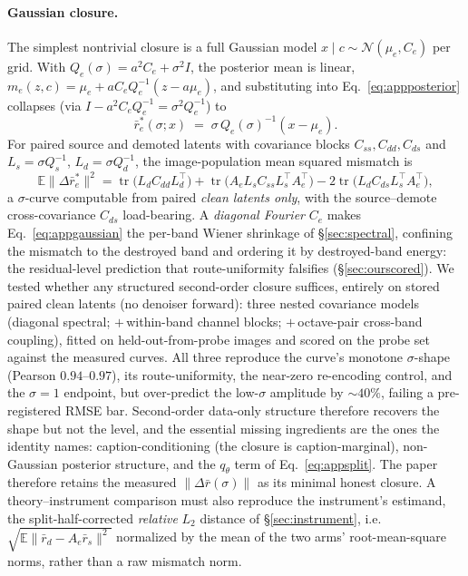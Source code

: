 \paragraph{Gaussian closure.}
The simplest nontrivial closure is a full Gaussian model
$x \mid c \sim \mathcal{N}(\mu_e, C_e)$ per grid. With
$Q_e(\sigma) = a^2 C_e + \sigma^2 I$, the posterior mean is linear,
$m_e(z, c) = \mu_e + a C_e Q_e^{-1}(z - a \mu_e)$, and substituting
into Eq.~\ref{eq:appposterior} collapses (via
$I - a^2 C_e Q_e^{-1} = \sigma^2 Q_e^{-1}$) to
\begin{equation}
\bar r_e^{*}(\sigma; x) \;=\; \sigma\, Q_e(\sigma)^{-1} (x - \mu_e).
\label{eq:appgaussian}
\end{equation}
For paired source and demoted latents with covariance blocks
$C_{ss}, C_{dd}, C_{ds}$ and $L_s = \sigma Q_s^{-1}$,
$L_d = \sigma Q_d^{-1}$, the image-population mean squared mismatch is
\begin{equation}
\mathbb{E}\big\|\Delta \bar r_e^{*}\big\|^2
= \operatorname{tr}\!\big(L_d C_{dd} L_d^{\!\top}\big)
+ \operatorname{tr}\!\big(A_e L_s C_{ss} L_s^{\!\top}
  A_e^{\!\top}\big)
- 2 \operatorname{tr}\!\big(L_d C_{ds} L_s^{\!\top}
  A_e^{\!\top}\big),
\label{eq:apptrace}
\end{equation}
a $\sigma$-curve computable from paired \emph{clean latents only},
with the source--demote cross-covariance $C_{ds}$ load-bearing. A
\emph{diagonal Fourier} $C_e$ makes Eq.~\ref{eq:appgaussian} the
per-band Wiener shrinkage of \S\ref{sec:spectral}, confining the
mismatch to the destroyed band and ordering it by destroyed-band
energy: the residual-level prediction that route-uniformity
falsifies (\S\ref{sec:ourscored}). We tested whether any structured
second-order closure suffices, entirely on stored paired clean
latents (no denoiser forward): three nested covariance models
(diagonal spectral; $+$\,within-band channel blocks;
$+$\,octave-pair cross-band coupling), fitted on held-out-from-probe
images and scored on the probe set against the measured curves. All
three reproduce the curve's monotone $\sigma$-shape (Pearson
$0.94$--$0.97$), its route-uniformity, the near-zero re-encoding
control, and the $\sigma{=}1$ endpoint, but over-predict the
low-$\sigma$ amplitude by ${\sim}40\%$, failing a pre-registered
RMSE bar. Second-order data-only structure therefore recovers the
shape but not the level, and the essential missing ingredients are
the ones the identity names: caption-conditioning (the closure is
caption-marginal), non-Gaussian posterior structure, and the
$q_{\theta}$ term of Eq.~\ref{eq:appsplit}. The paper therefore
retains the measured $\|\Delta \bar r(\sigma)\|$ as its minimal
honest closure. A theory--instrument comparison must also reproduce
the instrument's estimand, the split-half-corrected \emph{relative}
$L_2$ distance of \S\ref{sec:instrument}, i.e.\
$\sqrt{\mathbb{E}\|\bar r_d - A_e \bar r_s\|^2}$ normalized by the
mean of the two arms' root-mean-square norms, rather than a raw
mismatch norm.

